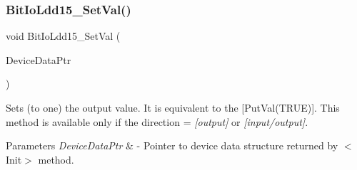 \subsubsection{\texorpdfstring{Bit\+Io\+Ldd15\+\_\+\+Set\+Val()}{BitIoLdd15\_SetVal()}}
{\footnotesize\ttfamily void Bit\+Io\+Ldd15\+\_\+\+Set\+Val (\begin{DoxyParamCaption}\item[{\hyperlink{group___p_e___types__module_gac5cf1362f1f0e3a2ce71b1bf2276d091}{L\+D\+D\+\_\+\+T\+Device\+Data} $\ast$}]{Device\+Data\+Ptr }\end{DoxyParamCaption})}



Sets (to one) the output value. It is equivalent to the \mbox{[}Put\+Val(\+T\+R\+U\+E)\mbox{]}. This method is available only if the direction = {\itshape \mbox{[}output\mbox{]}} or {\itshape \mbox{[}input/output\mbox{]}}. 


\begin{DoxyParams}{Parameters}
{\em Device\+Data\+Ptr} & -\/ Pointer to device data structure returned by $<$\+Init$>$ method. \\
\hline
\end{DoxyParams}
